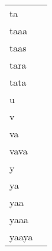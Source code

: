 \documentclass{article}
\begin{document}
\begin{longtable}{|l|p{}|}
ta & \textIndus{                                                         } \\
taaa & \textIndus{} \\
taas & \textIndus{} \\
tara & \textIndus{    } \\
tata & \textIndus{  } \\
u & \textIndus{        } \\
v & \textIndus{  } \\
va & \textIndus{            } \\
vava & \textIndus{} \\
y & \textIndus{                } \\
ya & \textIndus{                                          } \\
yaa & \textIndus{} \\
yaaa & \textIndus{} \\
yaaya & \textIndus{} \\
\end{longtable}
\end{document}

